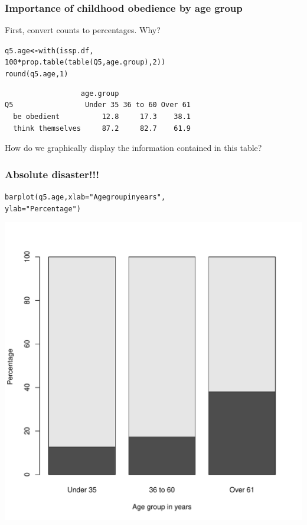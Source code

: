 \documentclass{beamer}\usepackage[]{graphicx}\usepackage[]{color}
\makeatletter
\newcommand{\hlnum}[1]{\textcolor[rgb]{0.533,0,0.133}{#1}}%
\newcommand{\hlstr}[1]{\textcolor[rgb]{0.667,0.267,0}{#1}}%
\newcommand{\hlopt}[1]{\textcolor[rgb]{0,0,0}{\textbf{#1}}}%
\newcommand{\hlstd}[1]{\textcolor[rgb]{0,0,0}{#1}}%
\newcommand{\hlkwb}[1]{\textcolor[rgb]{0,0,0.4}{\textbf{#1}}}%
\newcommand{\hlkwc}[1]{\textcolor[rgb]{0,0,0.4}{#1}}%
\newcommand{\hlkwd}[1]{\textcolor[rgb]{0,0.267,0.4}{#1}}%
\newenvironment{kframe}{%
 \def\at@end@of@kframe{}%
 \ifinner\ifhmode%
  \def\at@end@of@kframe{\end{minipage}}%
  \begin{minipage}{\columnwidth}%
 \fi\fi%
 \def\FrameCommand##1{\hskip\@totalleftmargin \hskip-\fboxsep
 \colorbox{shadecolor}{##1}\hskip-\fboxsep
     \hskip-\linewidth \hskip-\@totalleftmargin \hskip\columnwidth}%
 \MakeFramed {\advance\hsize-\width
   \@totalleftmargin\z@ \linewidth\hsize
   \@setminipage}}%
 {\par\unskip\endMakeFramed%
 \at@end@of@kframe}
\newenvironment{knitrout}{}{} %
\makeatother
\begin{document}
\begin{frame}[fragile]
  \frametitle{Importance of childhood obedience by age group}
First, convert counts to percentages. Why?
\begin{knitrout}
\color{fgcolor}\begin{kframe}
\begin{alltt}
\hlstd{q5.age} \hlkwb{<-} \hlkwd{with}\hlstd{(issp.df,}
               \hlnum{100}\hlopt{*}\hlkwd{prop.table}\hlstd{(}\hlkwd{table}\hlstd{(Q5, age.group),} \hlnum{2}\hlstd{))}
\hlkwd{round}\hlstd{(q5.age,} \hlnum{1}\hlstd{)}
\end{alltt}
\begin{verbatim}
                  age.group
Q5                 Under 35 36 to 60 Over 61
  be obedient          12.8     17.3    38.1
  think themselves     87.2     82.7    61.9
\end{verbatim}
\end{kframe}
\end{knitrout}
How do we graphically display the information contained in this table?
\end{frame}

\begin{frame}[fragile]
  \frametitle{Absolute disaster!!!}
\begin{knitrout}
\color{fgcolor}\begin{kframe}
\begin{alltt}
\hlkwd{barplot}\hlstd{(q5.age,} \hlkwc{xlab} \hlstd{=} \hlstr{"Age group in years"}\hlstd{,}
        \hlkwc{ylab} \hlstd{=} \hlstr{"Percentage"}\hlstd{)}
\end{alltt}
\end{kframe}

{\centering \includegraphics[width=0.45\linewidth]{figure/bar1-1} 

}



\end{knitrout}
\end{frame}
\end{document}
